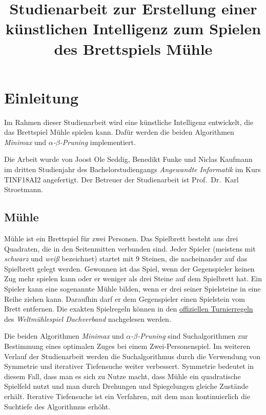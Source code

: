 \documentclass[11pt]{article}
\title{Studienarbeit zur Erstellung einer künstlichen Intelligenz zum Spielen des Brettspiels Mühle}
\date{}
\begin{document}
    
    \maketitle
    
    

    
    \hypertarget{studienarbeit-zur-erstellung-einer-kuxfcnstlichen-intelligenz-zum-spielen-des-brettspiels-muxfchle}{%
\section{Einleitung}\label{studienarbeit-zur-erstellung-einer-kuxfcnstlichen-intelligenz-zum-spielen-des-brettspiels-muxfchle}}

Im Rahmen dieser Studienarbeit wird eine künstliche Intelligenz
entwickelt, die das Brettspiel Mühle spielen kann. Dafür werden die
beiden Algorithmen \emph{Minimax} und \emph{$\alpha$-$\beta$-Pruning} implementiert.

Die Arbeit wurde von Joost Ole Seddig, Benedikt Funke und Niclas
Kaufmann im dritten Studienjahr des Bachelorstudiengangs
\emph{Angewandte Informatik} im Kurs TINF18AI2 angefertigt. Der Betreuer
der Studienarbeit ist Prof.~Dr.~Karl Stroetmann.

    \hypertarget{einleitung}{%
\subsection{Mühle}\label{einleitung}}

Mühle ist ein Brettspiel für zwei Personen. Das Spielbrett besteht aus
drei Quadraten, die in den Seitenmitten verbunden sind. Jeder Spieler
(meistens mit \emph{schwarz} und \emph{weiß} bezeichnet) startet mit 9
Steinen, die nacheinander auf das Spielbrett gelegt werden. Gewonnen ist
das Spiel, wenn der Gegenspieler keinen Zug mehr spielen kann oder er
weniger als drei Steine auf dem Spielbrett hat. Ein Spieler kann eine
sogenannte Mühle bilden, wenn er drei seiner Spielsteine in eine Reihe
ziehen kann. Daraufhin darf er dem Gegenspieler einen Spielstein vom
Brett entfernen. Die exakten Spielregeln können in den
\href{http://www.muehlespiel.eu/images/pdf/WMD_Turnierreglement.pdf}{offiziellen
Turnierregeln} des \emph{Weltmühlespiel Dachverband} nachgelesen werden.

Die beiden Algorithmen \emph{Minimax} und \emph{$\alpha$-$\beta$-Pruning} sind
Suchalgorithmen zur Bestimmung eines optimalen Zuges bei einem
Zwei-Personenspiel. Im weiteren Verlauf der Studienarbeit werden die
Suchalgorithmus durch die Verwendung von Symmetrie und iterativer
Tiefensuche weiter verbessert. Symmetrie bedeutet in diesem Fall, dass
man es sich zu Nutze macht, dass Mühle ein quadratische Spielfeld nutzt
und man durch Drehungen und Spiegelungen gleiche Zustände erhält.
Iterative Tiefensuche ist ein Verfahren, mit dem man kontinuierlich die
Suchtiefe des Algorithmus erhöht.
\end{document}
